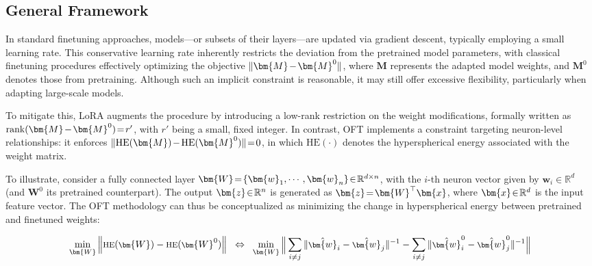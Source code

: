 \subsection{General Framework}

In standard finetuning approaches, models—or subsets of their layers—are updated via gradient descent, typically employing a small learning rate. This conservative learning rate inherently restricts the deviation from the pretrained model parameters, with classical finetuning procedures effectively optimizing the objective $\thickmuskip=2mu \medmuskip=2mu \| \bm{M} - \bm{M}^0\|$, where $\bm{M}$ represents the adapted model weights, and $\bm{M}^0$ denotes those from pretraining. Although such an implicit constraint is reasonable, it may still offer excessive flexibility, particularly when adapting large-scale models. 

To mitigate this, LoRA augments the procedure by introducing a low-rank restriction on the weight modifications, formally written as $\thickmuskip=2mu \medmuskip=2mu \text{rank}(\bm{M} - \bm{M}^0)=r'$, with $r'$ being a small, fixed integer. In contrast, OFT implements a constraint targeting neuron-level relationships: it enforces $\thickmuskip=2mu \medmuskip=2mu \| \text{HE}(\bm{M})-\text{HE}(\bm{M}^0) \|=0$, in which $\text{HE}(\cdot)$ denotes the hyperspherical energy associated with the weight matrix. 

To illustrate, consider a fully connected layer $\thickmuskip=2mu \medmuskip=2mu \bm{W}=\{\bm{w}_1,\cdots,\bm{w}_n\}\in\mathbb{R}^{d\times n}$, with the $i$-th neuron vector given by $\bm{w}_i\in\mathbb{R}^{d}$ (and $\bm{W}^0$ its pretrained counterpart). The output $\thickmuskip=2mu \medmuskip=2mu \bm{z}\in\mathbb{R}^n$ is generated as $\thickmuskip=2mu \medmuskip=2mu \bm{z}=\bm{W}^\top\bm{x}$, where $\thickmuskip=2mu \medmuskip=2mu \bm{x}\in\mathbb{R}^d$ is the input feature vector. The OFT methodology can thus be conceptualized as minimizing the change in hyperspherical energy between pretrained and finetuned weights:

\begin{equation}\label{eq:oft_principle}
\footnotesize
\min_{\bm{W}} \left\| \text{HE}(\bm{W})-\text{HE}(\bm{W}^0)\right\|~~\Leftrightarrow~~\min_{\bm{W}} \bigg{\|} \sum_{i\neq j} \|\hat{\bm{w}}_i-\hat{\bm{w}}_j\|^{-1}-\sum_{i\neq j} \|\hat{\bm{w}}^0_i-\hat{\bm{w}}^0_j\|^{-1}\bigg{\|}
\end{equation}

